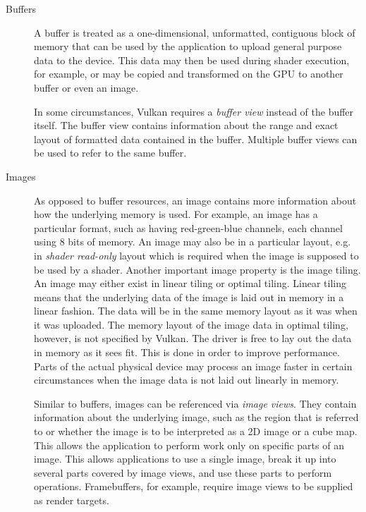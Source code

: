     \begin{description}
      \item[Buffers]
        A buffer is treated as a one-dimensional, unformatted, contiguous block of memory that can be used by the \gls{application} to upload general purpose data to the device. This data may then be used during shader execution, for example, or may be copied and transformed on the GPU to another buffer or even an image.

        In some circumstances, Vulkan requires a \textit{buffer view} instead of the buffer itself.
        The buffer view contains information about the range and exact layout of formatted data contained in the buffer.
        Multiple buffer views can be used to refer to the same buffer.

      \item[Images]
        As opposed to buffer resources, an image contains more information about how the underlying memory is used. For example, an image has a particular format, such as having red-green-blue channels, each channel using 8 bits of memory. An image may also be in a particular layout, e.g. in \textit{shader read-only} layout which is required when the image is supposed to be used by a shader. Another important image property is the image tiling. An image may either exist in linear tiling or optimal tiling. Linear tiling means that the underlying data of the image is laid out in memory in a linear fashion. The data will be in the same memory layout as it was when it was uploaded. The memory layout of the image data in optimal tiling, however, is not specified by Vulkan. The \gls{driver} is free to lay out the data in memory as it sees fit. This is done in order to improve performance. Parts of the actual physical device may process an image faster in certain circumstances when the image data is not laid out linearly in memory.

        Similar to buffers, images can be referenced via \textit{image views}.
        They contain information about the underlying image, such as the region that is referred to or whether the image is to be interpreted as a 2D image or a cube map.
        This allows the application to perform work only on specific parts of an image.
        This allows applications to use a single image, break it up into several parts covered by image views, and use these parts to perform operations.
        Framebuffers, for example, require image views to be supplied as render targets.
    \end{description}


